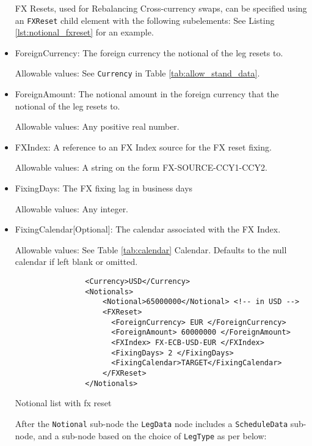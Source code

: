 \begin{itemize}
FX Resets,  used for Rebalancing Cross-currency swaps, can be specified using an \lstinline!FXReset! child element with the following subelements:  See Listing \ref{lst:notional_fxreset} for an example. \break

\item ForeignCurrency: The foreign currency the notional of the leg resets to.  

Allowable values:  See \lstinline!Currency!  in Table \ref{tab:allow_stand_data}.

\item ForeignAmount: The notional amount in the foreign currency that the notional of the leg resets to.  

Allowable values:  Any positive real number.

\item FXIndex: A reference to an FX Index source for the FX reset fixing. 

Allowable values:  A string on the form FX-SOURCE-CCY1-CCY2.

\item FixingDays: The FX fixing lag in business days

Allowable values:  Any integer.

\item FixingCalendar[Optional]: The calendar associated with the FX Index. 

Allowable values: See Table \ref{tab:calendar} Calendar. Defaults to the null calendar if left blank or omitted.



 \begin{listing}[H]
\begin{verbatim}
                <Currency>USD</Currency>
                <Notionals>
                    <Notional>65000000</Notional> <!-- in USD -->
                    <FXReset>
                      <ForeignCurrency> EUR </ForeignCurrency>
                      <ForeignAmount> 60000000 </ForeignAmount>
                      <FXIndex> FX-ECB-USD-EUR </FXIndex>
                      <FixingDays> 2 </FixingDays>
                      <FixingCalendar>TARGET</FixingCalendar>
                    </FXReset>
                </Notionals>
\end{verbatim}
\caption{Notional list with fx reset}
\label{lst:notional_fxreset}
\end{listing}


After the \lstinline!Notional! sub-node the \lstinline!LegData! node includes a \lstinline!ScheduleData! sub-node, and a sub-node based on the choice of \lstinline!LegType! as per below:


\end{itemize}
